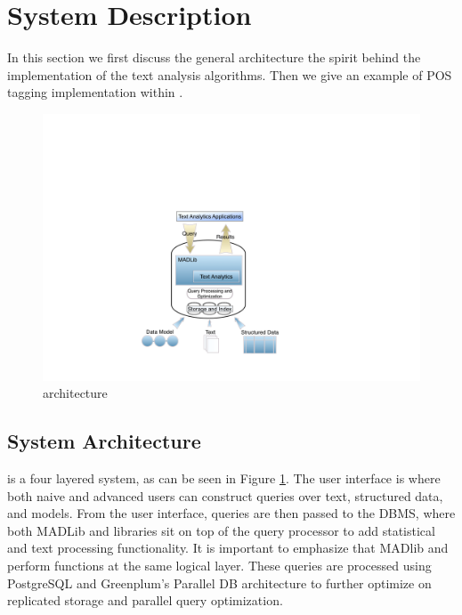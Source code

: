 
\section{System Description}

In this section we first discuss the general architecture the
spirit behind the implementation of the text analysis algorithms.
Then we give an example of POS tagging implementation within 
\system.


\begin{figure}
   \begin{center}
        \includegraphics[scale=0.2]{content/graphics/arch.png}
        \caption{{\system} architecture}
        \label{fig:arch}
   \end{center}
\end{figure}
    
\subsection{System Architecture}

{\system} is a four layered system, as can be seen in Figure \ref{fig:arch}.
The user interface is where both naive and advanced users can construct queries over
text, structured data, and models. From the user interface, queries are then passed to the
DBMS, where both MADLib and {\system} libraries sit on top of the query processor to
add statistical and text processing functionality. 
It is important to emphasize that MADlib and {\system} perform functions
at the same logical layer.  These queries are processed using 
PostgreSQL and Greenplum's Parallel DB architecture to further optimize on 
replicated storage and parallel query optimization. 


